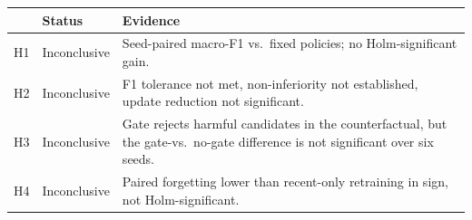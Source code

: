 \begin{tabular}{llp{5.4cm}}
\toprule
 & Status & Evidence \\
\midrule
H1 & Inconclusive & Seed-paired macro-F1 vs.\ fixed policies; no Holm-significant gain. \\
H2 & Inconclusive & F1 tolerance not met, non-inferiority not established, update reduction not significant. \\
H3 & Inconclusive & Gate rejects harmful candidates in the counterfactual, but the gate-vs.\ no-gate difference is not significant over six seeds. \\
H4 & Inconclusive & Paired forgetting lower than recent-only retraining in sign, not Holm-significant. \\
\bottomrule
\end{tabular}
